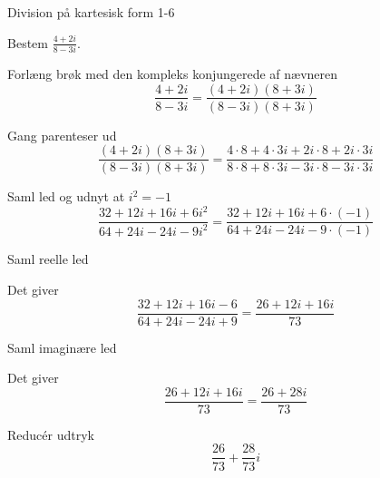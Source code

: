 \documentclass{article}
\begin{document}
\begin{exercise}{Division på kartesisk form 1-6}
	
	Bestem $\frac{4+2i}{8-3i}$.
	
	
	
	\hint 
	
	Forlæng brøk med den kompleks konjungerede af nævneren
	\[
	\frac{4+2i}{8-3i} = \frac{(4+2i)(8+3i)}{(8-3i)(8+3i)}
	\]
	
	\hint
	
	Gang parenteser ud
	\[
	\frac{(4+2i)(8+3i)}{(8-3i)(8+3i)} = \frac{4 \cdot 8 + 4 \cdot 3i + 2i \cdot 8 + 2i \cdot 3i}{8 \cdot 8 + 8 \cdot 3i - 3i \cdot 8 -3i \cdot 3i}
	\]
	
	\hint 
	
	Saml led og udnyt at $i^2 = -1$
	\[
	 \frac{32+12i+16i+6i^2}{64+24i-24i-9i^2} = \frac{32+12i+16i+6 \cdot (-1)}{64+24i-24i-9 \cdot (-1)}
	\]
	
	\hint
	
	Saml reelle led
	
	\hint
	
	Det giver
	\[
	\frac{32+12i+16i- 6}{64+24i-24i+9 } = \frac{26+12i +16i}{73}
	\]
	
	\hint
	
	Saml imaginære led
	
	
	\hint
	
	Det giver 
	\[
	\frac{26+12i +16i}{73} = \frac{26+28i}{73}
	\]
	
	\hint
	
	Reducér udtryk
	\[
	\frac{26}{73} + \frac{28}{73}i
	\]
	
\end{exercise}

\newpage
\end{document}
